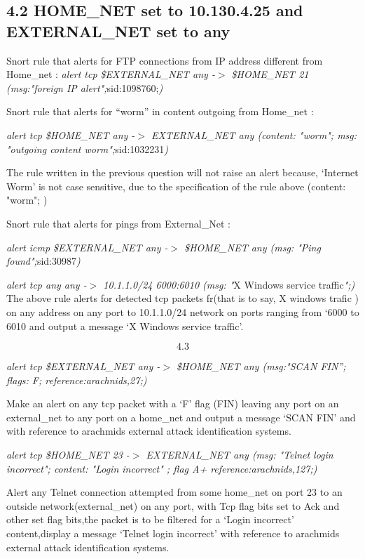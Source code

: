 \documentclass{article} %
\begin{document}
\noindent 

\noindent 
\subsection{ 4.2 HOME\_NET set to  10.130.4.25  and  EXTERNAL\_NET  set to any}

\noindent Snort rule that alerts for FTP connections from IP address different from Home\_net : \textit{alert tcp \$EXTERNAL\_NET any -$>$ \$HOME\_NET 21 (msg:"foreign IP alert";}sid:1098760;\textit{)}

\noindent Snort rule that alerts for ``worm'' in content outgoing from Home\_net :

\noindent \textit{alert tcp \$HOME\_NET  any -$>$ EXTERNAL\_NET  any (content: "worm"; msg: "outgoing content worm";}sid:1032231\textit{)}

\noindent The rule written in the previous question will not raise an alert because, `Internet Worm' is not case sensitive, due to the specification of  the rule above (content: "worm"; )  

\noindent Snort rule that alerts for pings from External\_Net :

\noindent \textit{alert icmp \$EXTERNAL\_NET  any -$>$ \$HOME\_NET  any (msg: "Ping found";}sid:30987\textit{)}

\noindent \textit{alert tcp any any -$>$ 10.1.1.0/24 6000:6010 (msg: "}X Windows service traffic\textit{";) }The above rule alerts for detected tcp packets fr(that is to say, X windows trafic ) on any address on any port to 10.1.1.0/24 network on ports ranging from `6000 to 6010  and output a message `X Windows service traffic'.

\noindent 
\[4.3\] 
\textit{}

\noindent \textit{alert tcp \$EXTERNAL\_NET any -$>$ \$HOME\_NET  any (msg:"SCAN FIN''; flags: F; reference:arachnids,27;)}

\noindent Make an alert on any tcp packet with a `F'  flag (FIN) leaving any port on an external\_net to any port on a  home\_net and output a message `SCAN FIN'  and with reference to arachmids external attack identification systems.

\noindent \textit{alert tcp \$HOME\_NET 23 -$>$ EXTERNAL\_NET any (msg: "Telnet login incorrect"; content: "Login incorrect" ; flag A+ reference:arachnids,127;)}

\noindent Alert any Telnet connection attempted from some home\_net on port 23 to an outside network(external\_net) on any port, with Tcp flag bits set to Ack and other set flag bits,the packet is to be filtered for a `Login incorrect' content,display a message `Telnet login incorrect'  with reference to arachmids  external attack identification systems.
\end{document}
